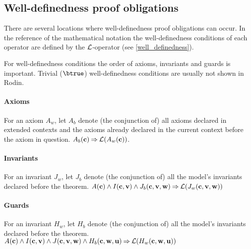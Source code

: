 \subsection{Well-definedness proof obligations}
\label{well_definedness_proof_obligations}
There are several locations where well-definedness proof obligations can occur.
In the reference of the mathematical notation the well-definedness conditions
of each operator are defined by the $\mathcal{L}$-operator (see \ref{well_definedness}).

For well-definedness conditions the order of axioms, invariants and guards is important.
Trivial ($\btrue$) well-definedness conditions are usually not shown in Rodin.

\paragraph{Axioms}
\label{well_definedness_of_axioms}
For an axiom $A_w$, 
  let $A_b$ denote (the conjunction of) all axioms declared
  in extended contexts and the axioms already declared in
  the current context before the axiom in question.
%
  {$A_b(\mathbf{c}) \mathbin\Rightarrow \mathcal{L}(A_w(\mathbf{c}))$}.

\paragraph{Invariants}
\label{well_definedness_of_invariants}
For an invariant $J_w$, 
  let $J_b$ denote (the conjunction of) all the model's 
  invariants declared before the theorem.
%
  {$A(\mathbf{c}) \land I(\mathbf{c},\mathbf{v}) \land J_b(\mathbf{c},\mathbf{v},\mathbf{w})
    \mathbin\Rightarrow \mathcal{L}(J_w(\mathbf{c},\mathbf{v},\mathbf{w}))$}

\paragraph{Guards}
\label{well_definedness_of_guards}
For an invariant $H_w$, 
  let $H_b$ denote (the conjunction of) all the model's 
  invariants declared before the theorem.
%
  {$A(\mathbf{c}) \land I(\mathbf{c},\mathbf{v}) \land J(\mathbf{c},\mathbf{v},\mathbf{w}) \land
    H_b(\mathbf{c},\mathbf{w},\mathbf{u}) 
    \mathbin\Rightarrow \mathcal{L}(H_w(\mathbf{c},\mathbf{w},\mathbf{u}))$}

